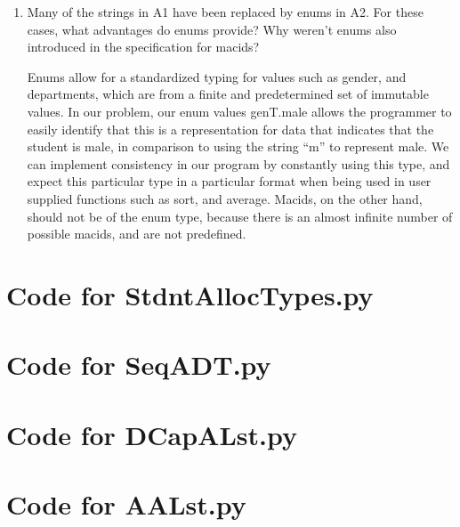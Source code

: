 \documentclass[12pt]{article}
\begin{document}
\begin{enumerate}[label=\alph*]
\item Many of the strings in A1 have been replaced by enums in A2. For these cases, what advantages do enums provide? Why weren't enums also introduced in the specification for macids?

Enums allow for a standardized typing for values such as gender, and departments, which are from a finite and predetermined set of immutable values. In our problem, our enum values genT.male allows the programmer to easily identify that this is a representation for data that indicates that the student is male, in comparison to using the string ``m'' to represent male. We can implement consistency in our program by constantly using this type, and expect this particular type in a particular format when being used in user supplied functions such as sort, and average. Macids, on the other hand, should not be of the enum type, because there is an almost infinite number of possible macids, and are not predefined.


\end{enumerate}

\newpage

\lstset{language=Python, basicstyle=\tiny, breaklines=true, showspaces=false,
  showstringspaces=false, breakatwhitespace=true}

\def\thesection{\Alph{section}}

\section{Code for StdntAllocTypes.py}

\noindent 

\newpage

\section{Code for SeqADT.py}

\noindent 

\newpage

\section{Code for DCapALst.py}

\noindent 

\newpage

\section{Code for AALst.py}
\end{document}
